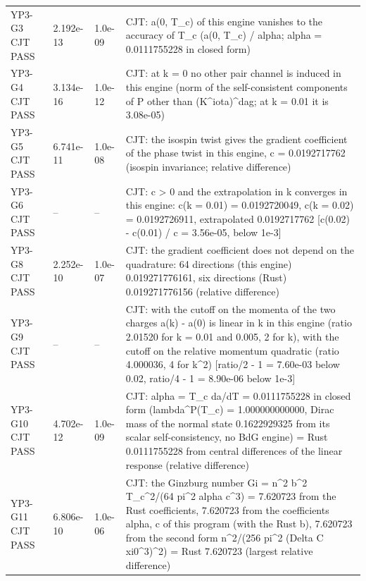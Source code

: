 \documentclass[aps,prd,onecolumn,superscriptaddress,nofootinbib,floatfix,longbibliography]{revtex4-2}
\begin{document}
\begin{longtable}{p{}p{}p{}p{}}
YP3-G3 CJT \newline PASS & 2.192e-13 & 1.0e-09 & CJT: a(0, T\_c) of this engine vanishes to the accuracy of T\_c (\textbar{}a(0, T\_c)\textbar{} / alpha; alpha = 0.0111755228 in closed form) \\
YP3-G4 CJT \newline PASS & 3.134e-16 & 1.0e-12 & CJT: at k = 0 no other pair channel is induced in this engine (norm of the self-consistent components of P other than (K\textasciicircum{}iota)\textasciicircum{}dag; at k = 0.01 it is 3.08e-05) \\
YP3-G5 CJT \newline PASS & 6.741e-11 & 1.0e-08 & CJT: the isospin twist gives the gradient coefficient of the phase twist in this engine, c = 0.0192717762 (isospin invariance; relative difference) \\
YP3-G6 CJT \newline PASS & -- & -- & CJT: c \textgreater{} 0 and the extrapolation in k converges in this engine: c(k = 0.01) = 0.0192720049, c(k = 0.02) = 0.0192726911, extrapolated 0.0192717762 [\textbar{}c(0.02) - c(0.01)\textbar{} / c = 3.56e-05, below 1e-3] \\
YP3-G8 CJT \newline PASS & 2.252e-10 & 1.0e-07 & CJT: the gradient coefficient does not depend on the quadrature: 64 directions (this engine) 0.019271776161, six directions (Rust) 0.019271776156 (relative difference) \\
YP3-G9 CJT \newline PASS & -- & -- & CJT: with the cutoff on the momenta of the two charges a(k) - a(0) is linear in \textbar{}k\textbar{} in this engine (ratio 2.01520 for k = 0.01 and 0.005, 2 for \textbar{}k\textbar{}), with the cutoff on the relative momentum quadratic (ratio 4.000036, 4 for k\textasciicircum{}2) [\textbar{}ratio/2 - 1\textbar{} = 7.60e-03 below 0.02, \textbar{}ratio/4 - 1\textbar{} = 8.90e-06 below 1e-3] \\
YP3-G10 CJT \newline PASS & 4.702e-12 & 1.0e-09 & CJT: alpha = T\_c da/dT = 0.0111755228 in closed form (lambda\textasciicircum{}P(T\_c) = 1.000000000000, Dirac mass of the normal state 0.1622929325 from its scalar self-consistency, no BdG engine) = Rust 0.0111755228 from central differences of the linear response (relative difference) \\
YP3-G11 CJT \newline PASS & 6.806e-10 & 1.0e-06 & CJT: the Ginzburg number Gi = n\textasciicircum{}2 b\textasciicircum{}2 T\_c\textasciicircum{}2/(64 pi\textasciicircum{}2 alpha c\textasciicircum{}3) = 7.620723 from the Rust coefficients, 7.620723 from the coefficients alpha, c of this program (with the Rust b), 7.620723 from the second form n\textasciicircum{}2/(256 pi\textasciicircum{}2 (Delta C xi0\textasciicircum{}3)\textasciicircum{}2) = Rust 7.620723 (largest relative difference) \\

\end{longtable}
\end{document}
